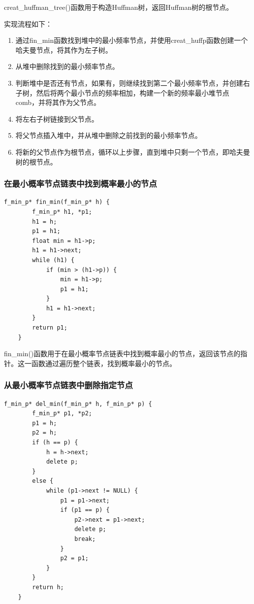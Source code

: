 \documentclass[UTF8,12pt]{article}
\begin{document}
creat\_huffman\_tree()函数用于构造Huffman树，返回Huffman树的根节点。

实现流程如下：
\begin{enumerate}
    \item 通过fin\_min函数找到堆中的最小频率节点，并使用creat\_huffp函数创建一个哈夫曼节点，将其作为左子树。
    \item 从堆中删除找到的最小频率节点。
    \item 判断堆中是否还有节点，如果有，则继续找到第二个最小频率节点，并创建右子树，然后将两个最小节点的频率相加，构建一个新的频率最小堆节点comb，并将其作为父节点。
    \item 将左右子树链接到父节点。
    \item 将父节点插入堆中，并从堆中删除之前找到的最小频率节点。
    \item 将新的父节点作为根节点，循环以上步骤，直到堆中只剩一个节点，即哈夫曼树的根节点。
\end{enumerate}

\subsubsection{在最小概率节点链表中找到概率最小的节点}
\begin{lstlisting}[frame=shadowbox] 
    f_min_p* fin_min(f_min_p* h) {
        f_min_p* h1, *p1;
        h1 = h;
        p1 = h1;
        float min = h1->p;
        h1 = h1->next;
        while (h1) {
            if (min > (h1->p)) {
                min = h1->p;
                p1 = h1;
            }
            h1 = h1->next;
        }
        return p1;
    }
\end{lstlisting}

fin\_min()函数用于在最小概率节点链表中找到概率最小的节点，返回该节点的指针。这一函数通过遍历整个链表，找到概率最小的节点。

\subsubsection{从最小概率节点链表中删除指定节点}
\begin{lstlisting}[frame=shadowbox] 
    f_min_p* del_min(f_min_p* h, f_min_p* p) {
        f_min_p* p1, *p2;
        p1 = h;
        p2 = h;
        if (h == p) {
            h = h->next;
            delete p;
        }
        else {
            while (p1->next != NULL) {
                p1 = p1->next;
                if (p1 == p) {
                    p2->next = p1->next;
                    delete p;
                    break;
                }
                p2 = p1;
            }
        }
        return h;
    }
\end{lstlisting}
\end{document}
